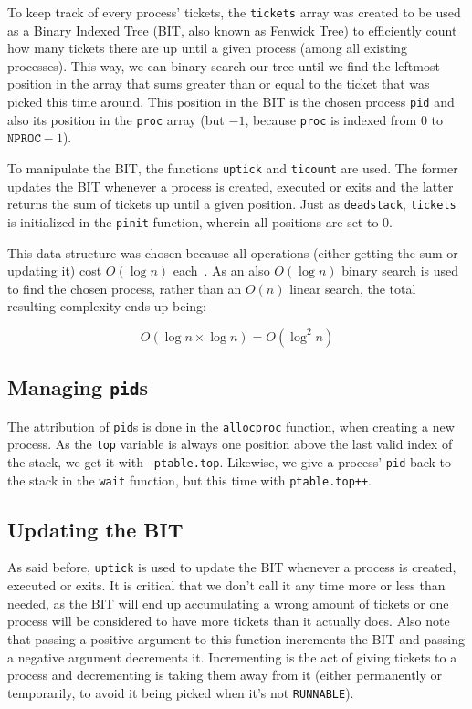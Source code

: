\documentclass[12pt]{article}
\begin{document}
To keep track of every process' tickets, the \texttt{tickets} array was created to be used as a Binary Indexed Tree (BIT, also known as Fenwick Tree) to efficiently count how many tickets there are up until a given process (among all existing processes). This way, we can binary search our tree until we find the leftmost position in the array that sums greater than or equal to the ticket that was picked this time around. This position in the BIT is the chosen process \texttt{pid} and also its position in the \texttt{proc} array (but $- 1$, because \texttt{proc} is indexed from 0 to $\texttt{NPROC} - 1$).

To manipulate the BIT, the functions \texttt{uptick} and \texttt{ticount} are used. The former updates the BIT whenever a process is created, executed or exits and the latter returns the sum of tickets up until a given position. Just as \texttt{deadstack}, \texttt{tickets} is initialized in the \texttt{pinit} function, wherein all positions are set to 0.

This data structure was chosen because all operations (either getting the sum or updating it) cost $O(\log n)$ each~\cite{halim:13}. As an also $O(\log n)$ binary search is used to find the chosen process, rather than an $O(n)$ linear search, the total resulting complexity ends up being:

$$O(\log n \times \log n) = O(\log^2 n)$$

\subsection{Managing \texttt{pid}s}
The attribution of \texttt{pid}s is done in the \texttt{allocproc} function, when creating a new process. As the \texttt{top} variable is always one position above the last valid index of the stack, we get it with \texttt{--ptable.top}. Likewise, we give a process' \texttt{pid} back to the stack in the \texttt{wait} function, but this time with \texttt{ptable.top++}.

\subsection{Updating the BIT}
As said before, \texttt{uptick} is used to update the BIT whenever a process is created, executed or exits. It is critical that we don't call it any time more or less than needed, as the BIT will end up accumulating a wrong amount of tickets or one process will be considered to have more tickets than it actually does. Also note that passing a positive argument to this function increments the BIT and passing a negative argument decrements it. Incrementing is the act of giving tickets to a process and decrementing is taking them away from it (either permanently or temporarily, to avoid it being picked when it's not \texttt{RUNNABLE}).
\end{document}
